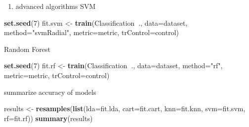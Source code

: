 \documentclass[]{book}
\newenvironment{Shaded}{\begin{snugshade}}{\end{snugshade}}
\newcommand{\DataTypeTok}[1]{\textcolor[rgb]{0.13,0.29,0.53}{#1}}
\newcommand{\DecValTok}[1]{\textcolor[rgb]{0.00,0.00,0.81}{#1}}
\newcommand{\KeywordTok}[1]{\textcolor[rgb]{0.13,0.29,0.53}{\textbf{#1}}}
\newcommand{\NormalTok}[1]{#1}
\newcommand{\OperatorTok}[1]{\textcolor[rgb]{0.81,0.36,0.00}{\textbf{#1}}}
\newcommand{\StringTok}[1]{\textcolor[rgb]{0.31,0.60,0.02}{#1}}
\providecommand{\tightlist}{%
  \setlength{\itemsep}{0pt}\setlength{\parskip}{0pt}}
\begin{document}
\begin{enumerate}
\def\labelenumi{\alph{enumi})}
\setcounter{enumi}{2}
\tightlist
\item
  advanced algorithms
  SVM
\end{enumerate}

\begin{Shaded}
\begin{Highlighting}[]
\KeywordTok{set.seed}\NormalTok{(}\DecValTok{7}\NormalTok{)}
\NormalTok{fit.svm <-}\StringTok{ }\KeywordTok{train}\NormalTok{(Classification}\OperatorTok{~}\NormalTok{., }\DataTypeTok{data=}\NormalTok{dataset, }\DataTypeTok{method=}\StringTok{"svmRadial"}\NormalTok{, }\DataTypeTok{metric=}\NormalTok{metric, }\DataTypeTok{trControl=}\NormalTok{control)}
\end{Highlighting}
\end{Shaded}

Random Forest

\begin{Shaded}
\begin{Highlighting}[]
\KeywordTok{set.seed}\NormalTok{(}\DecValTok{7}\NormalTok{)}
\NormalTok{fit.rf <-}\StringTok{ }\KeywordTok{train}\NormalTok{(Classification}\OperatorTok{~}\NormalTok{., }\DataTypeTok{data=}\NormalTok{dataset, }\DataTypeTok{method=}\StringTok{"rf"}\NormalTok{, }\DataTypeTok{metric=}\NormalTok{metric, }\DataTypeTok{trControl=}\NormalTok{control)}
\end{Highlighting}
\end{Shaded}

summarize accuracy of models

\begin{Shaded}
\begin{Highlighting}[]
\NormalTok{results <-}\StringTok{ }\KeywordTok{resamples}\NormalTok{(}\KeywordTok{list}\NormalTok{(}\DataTypeTok{lda=}\NormalTok{fit.lda, }\DataTypeTok{cart=}\NormalTok{fit.cart, }\DataTypeTok{knn=}\NormalTok{fit.knn, }\DataTypeTok{svm=}\NormalTok{fit.svm, }\DataTypeTok{rf=}\NormalTok{fit.rf))}
\KeywordTok{summary}\NormalTok{(results)}
\end{Highlighting}
\end{Shaded}
\end{document}

